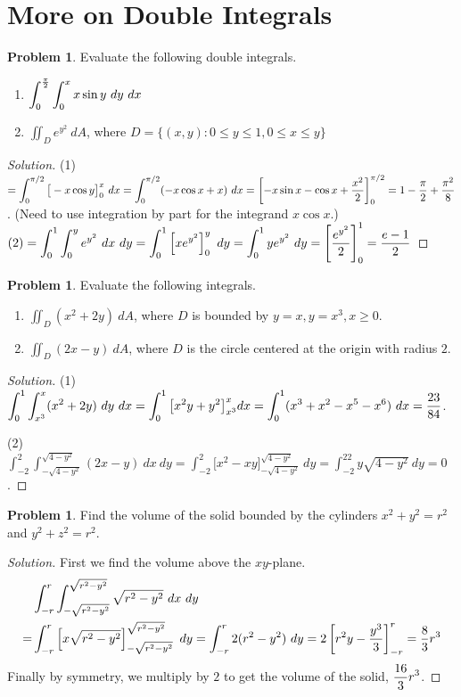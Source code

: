 \documentclass[12pt]{amsart}%
\theoremstyle{plain}
\theoremstyle{definition}
\newtheorem{prob}[theorem]{Problem}
\theoremstyle{special}
\newcommand{\sol}[1]{
{\begin{proof}[Solution]#1\end{proof}}
}
\newcommand{\Prob}[1]{\begin{tcolorbox}%
\begin{prob}
	#1
\end{prob}
\end{tcolorbox}	
}
\begin{document}
\section{More on Double Integrals}
\Prob{Evaluate the following double integrals.
\begin{enumerate}
	\item $\displaystyle\int_0^{\pi\over 2}\int_0^x x\sin y\ dy  \ dx$\vspace{0.2cm}
	\item $\displaystyle\iint_D e^{y^2} \ d A $, where $D=\{(x,y):0\leq y\leq 1,0\leq x\leq y\}$
\end{enumerate}
}
{\sol{
(1) $\displaystyle =\int_0^{\pi/2}\big[-x\cos y\big]_0^x\ dx=\int_0^{\pi/2}(-x\cos x+x)\ dx =\left[-x\sin x-\cos x+{x^2\over 2} \right]_0^{\pi/2}=1-{\pi\over 2}+{\pi^2\over 8}$. (Need to use integration by part for the integrand $x\cos x$.)
\hfill  \hspace{1cm}{ (2)} $\text{(2)}\displaystyle = \int_0^1\int_0^ye^{y^2}\ dx\ dy=\int_0^1\left[xe^{y^2}\right]_0^y\ dy=\int_0^1ye^{y^2}\ dy=\left[e^{y^2}\over 2\right]_0^1 ={e-1\over 2}$
}}
\Prob{Evaluate the following integrals.
\begin{enumerate}
	\item $\displaystyle\iint_D (x^2+2y)\ dA$, where $D$ is bounded by $y=x,y=x^3,x\geq 0$.\vspace{0.2cm}
	\item $\displaystyle\iint_D(2x-y)\ dA$, where $D$ is the circle centered at the origin with radius $2$.
\end{enumerate}}
{\sol{(1) $\displaystyle \int_0^1 \int^x_{x^3}(x^2+2y)\ dy\ dx=\int_0^1\big[x^2y+y^2\big]^x_{x^3} dx=\int_0^1(x^3+x^2-x^5-x^6)\ dx={23\over 84}$.

(2)$\displaystyle\int_{-2}^2\int_{-\sqrt{4-y^2}}^{\sqrt{4-y^2}} (2x-y) \ dx\ dy =\int_{-2}^2\big[x^2-xy\big]_{-\sqrt{4-y^2}}^{\sqrt{4-y^2}}\ dy=\int_{-2}^22y\sqrt{4-y^2}\ dy=0$.}
}
\Prob{Find the volume of the solid bounded by the cylinders $x^2+y^2=r^2$ and $y^2+z^2=r^2$.}
{\sol{First we find the volume above the $xy$-plane.
\begin{align*}
&\int_{-r}^r\int_{-\sqrt{r^2-y^2}}^{\sqrt{r^2-y^2}}\sqrt{r^2-y^2}\ dx\ dy	\\
=&\int_{-r}^r \left[x\sqrt{r^2-y^2}\right]_{-\sqrt{r^2-y^2}}^{\sqrt{r^2-y^2}} \ dy=\int_{-r}^r 2(r^2-y^2)\ dy=2\left[r^2y-{y^3\over 3}\right]_{-r}^{r}={8\over 3}r^3
\end{align*}
Finally by symmetry, we multiply by $2$ to get the volume of the solid, $\displaystyle {16\over 3}r^3$.
}
}
\end{document}
